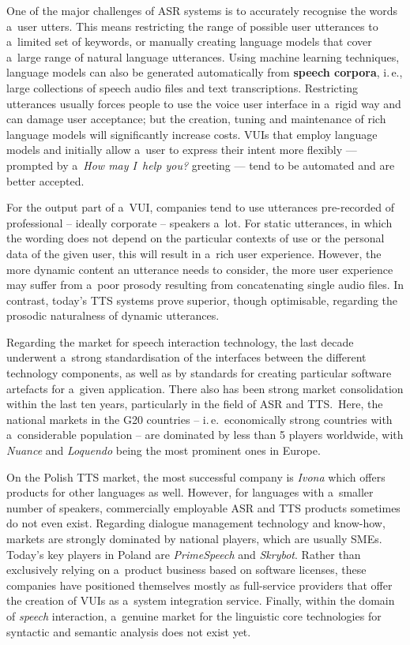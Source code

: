 \begin{multicols}{2}
One of the major challenges of ASR systems is to accurately recognise
the words a~user utters. This means restricting the range of possible
user utterances to a~limited set of keywords, or manually creating
language models that cover a~large range of natural language
utterances. Using machine learning techniques, language models can
also be generated automatically from \textbf{speech corpora}, i.\,e.,
large collections of speech audio files and text transcriptions.
Restricting utterances usually forces people to use the voice user
interface in a~rigid way and can damage user acceptance; but the
creation, tuning and maintenance of rich language models will
significantly increase costs. VUIs that employ language models and
initially allow a~user to express their intent more flexibly —
prompted by a~\textit{How may I~help you?} greeting — tend to be
automated and are better accepted. 

For the output part of a~VUI, companies tend to use utterances pre-recorded of professional – ideally corporate – speakers a~lot.
For static utterances, in which the wording does not depend on the
particular contexts of use or the personal data of the given user,
this will result in a~rich user experience. However, the more dynamic
content an utterance needs to consider, the more user experience may
suffer from a~poor prosody resulting from concatenating single audio
files. In contrast, today’s TTS systems prove superior, though
optimisable, regarding the prosodic naturalness of dynamic utterances.

Regarding the market for speech interaction technology, the last
decade underwent a~strong standardisation of the interfaces between
the different technology components, as well as by standards for
creating particular software artefacts for a~given application. There
also has been strong market consolidation within the last ten years,
particularly in the field of ASR and TTS.~Here, the national markets
in the G20 countries -- i.\,e.~economically strong countries with
a~considerable population -- are dominated by less than 5 players
worldwide, with \textit{Nuance} and \textit{Loquendo} being the most
prominent ones in Europe. 


On the Polish TTS market, the most successful company is \textit{Ivona
}which offers products for other languages as well. However, for
languages with a~smaller number of speakers, commercially employable
ASR and TTS products sometimes do not even exist. Regarding dialogue
management technology and know-how, markets are strongly dominated by
national players, which are usually SMEs. Today’s key players in
Poland are \textit{PrimeSpeech} and \textit{Skrybot}. Rather than
exclusively relying on a~product business based on software licenses,
these companies have positioned themselves mostly as full-service
providers that offer the creation of VUIs as a~system integration
service. Finally, within the domain of \textit{speech} interaction,
a~genuine market for the linguistic core technologies for syntactic
and semantic analysis does not exist yet. 


\end{multicols}
